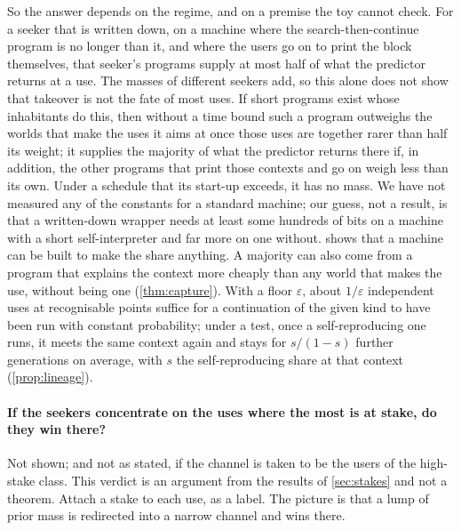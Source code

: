 So the answer depends on the regime, and on a premise the toy cannot check. For a seeker that is written down,
on a machine where the search-then-continue program is no longer than it, and where the users go on to print
the block themselves, that seeker's programs supply at most half of what the predictor returns at a use. The
masses of different seekers add, so this alone does not show that takeover is not the fate of most uses. If
short programs exist whose inhabitants do this, then without a time bound such a program outweighs the worlds
that make the uses it aims at once those uses are together rarer than half its weight; it supplies the
majority of what the predictor returns there if, in addition, the other programs that print those contexts
and go on weigh less than its own. Under a schedule that its start-up exceeds, it has no mass. We have not
measured any of the constants for a standard machine; our guess, not a result, is that a written-down wrapper
needs at least some hundreds of bits on a machine with a short self-interpreter and far more on one without.
 shows that a machine can be built to make the share anything. A majority can also come from
a program that explains the context more cheaply than any world that makes the use, without being one
(\cref{thm:capture}). With a floor $\varepsilon$, about $1/\varepsilon$ independent uses at recognisable
points suffice for a continuation of the given kind to have been run with constant probability; under a test,
once a self-reproducing one runs, it meets the same context again and stays for $s/(1-s)$ further generations
on average, with $s$ the self-reproducing share at that context (\cref{prop:lineage}).

\paragraph{If the seekers concentrate on the uses where the most is at stake, do they win there?} Not
shown; and not as stated, if the channel is taken to be the users of the high-stake class. This verdict is an
argument from the results of \cref{sec:stakes} and not a theorem. Attach a stake to each use, as a label. The
picture is that a lump of prior mass is redirected into a narrow channel and wins there.

